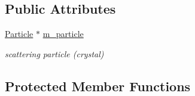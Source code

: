 \subsection*{Public Attributes}
\begin{DoxyCompactItemize}
\item 
\mbox{\label{class_tracing_a1efb92d44fd7c64e6a10379ef2d14dbd}} 
\mbox{\hyperlink{class_particle}{Particle}} $\ast$ \mbox{\hyperlink{class_tracing_a1efb92d44fd7c64e6a10379ef2d14dbd}{m\+\_\+particle}}
\begin{DoxyCompactList}\small\item\em scattering particle (crystal) \end{DoxyCompactList}\end{DoxyCompactItemize}
\subsection*{Protected Member Functions}
